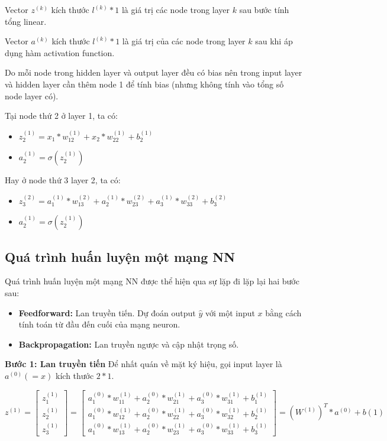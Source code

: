 Vector $z^{(k)}$ kích thước $l^{(k)} * 1$ là giá trị các node trong layer $k$ sau bước tính tổng linear.

Vector $a^{(k)}$ kích thước $l^{(k)} * 1$ là giá trị của các node trong layer $k$ sau khi áp dụng hàm activation function.



Do mỗi node trong hidden layer và output layer đều có bias nên trong input layer và hidden layer cần thêm node 1 để tính bias (nhưng không tính vào tổng số node layer có).

Tại node thứ 2 ở layer 1, ta có:

\begin{itemize}
\item $z_2^{(1)} =  x_1 * w_{12}^{(1)} +  x_2 * w_{22}^{(1)} + b_2^{(1)}$
\item $a_2^{(1)} = \sigma(z_2^{(1)})$
\end{itemize} 

Hay ở node thứ 3 layer 2, ta có:
\begin{itemize}
\item $z_3^{(2)} =  a_1^{(1)} * w_{13}^{(2)} + a_2^{(1)} * w_{23}^{(2)}  + a_3^{(1)} * w_{33}^{(2)} + b_3^{(2)}$
\item $a_2^{(1)} = \sigma(z_2^{(1)})$
\end{itemize} 

\subsection{Quá trình huấn luyện một mạng NN}

Quá trình huấn luyện một mạng NN được thể hiện qua sự lặp đi lặp lại hai bước sau:
\begin{itemize}
\item \textbf{Feedforward:} Lan truyền tiến. Dự đoán output $\hat{y}$ với một input $x$ bằng cách tính toán từ đầu đến cuối của mạng neuron.
\item \textbf{Backpropagation:} Lan truyền ngược và cập nhật trọng số.
\end{itemize}
\textbf{Bước 1: Lan truyền tiến}
Để nhất quán về mặt ký hiệu, gọi input layer là $a^{(0)} (=x)$ kích thước $2*1$.


$$z^{(1)} =  \begin{bmatrix}z_{1}^{(1)}\\z_{2}^{(1)}\\z_{3}^{(1)}\end{bmatrix} 
=  \begin{bmatrix}a_{1}^{(0)}*w_{11}^{(1)}+a_{2}^{(0)}*w_{21}^{(1)}+a_{3}^{(0)}*w_{31}^{(1)}+b_{1}^{(1)}\\a_{1}^{(0)}*w_{12}^{(1)}+a_{2}^{(0)}*w_{22}^{(1)}+a_{3}^{(0)}*w_{32}^{(1)}+b_{2}^{(1)}\\a_{1}^{(0)}*w_{13}^{(1)}+a_{2}^{(0)}*w_{23}^{(1)}+a_{3}^{(0)}*w_{33}^{(1)}+b_{3}^{(1)}\end{bmatrix} 
= (W^{(1)})^{T}*a^{(0)} + b(1)$$

